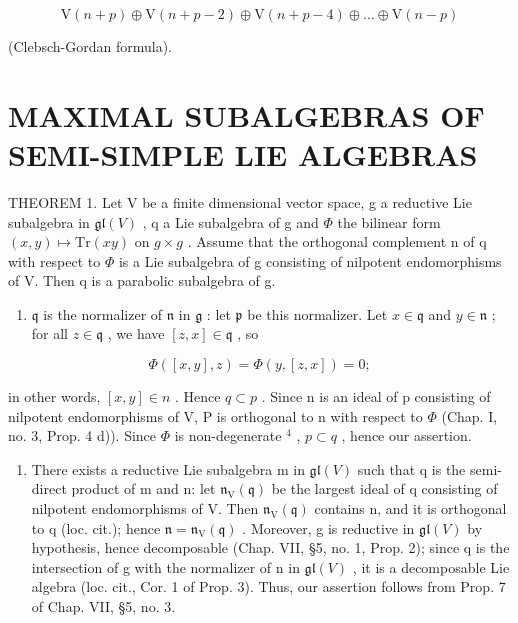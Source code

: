 \[
\mathrm{V} (n + p) \oplus \mathrm{V} (n + p - 2) \oplus \mathrm{V} (n + p - 4) \oplus \dots \oplus \mathrm{V} (n - p)
\]

(Clebsch-Gordan formula).

\section{MAXIMAL SUBALGEBRAS OF SEMI-SIMPLE LIE ALGEBRAS}

THEOREM 1. Let V be a finite dimensional vector space, g a reductive Lie subalgebra in \(\mathfrak{gl}(V)\) , q a Lie subalgebra of g and \(\Phi\) the bilinear form \((x,y)\mapsto\mathrm{Tr}(xy)\) on \(g\times g\) . Assume that the orthogonal complement n of q with respect to \(\Phi\) is a Lie subalgebra of g consisting of nilpotent endomorphisms of V. Then q is a parabolic subalgebra of g.

\begin{enumerate}
\def\labelenumi{\alph{enumi})}
\tightlist
\item
  \(\mathfrak{q}\) is the normalizer of \(\mathfrak{n}\) in \(\mathfrak{g}\) : let \(\mathfrak{p}\) be this normalizer. Let \(x \in \mathfrak{q}\) and \(y \in \mathfrak{n}\) ; for all \(z \in \mathfrak{q}\) , we have \([z, x] \in \mathfrak{q}\) , so
\end{enumerate}

\[
\Phi ([ x, y ], z) = \Phi (y, [ z, x ]) = 0;
\]

in other words, \([x,y] \in n\) . Hence \(q \subset p\) . Since n is an ideal of p consisting of nilpotent endomorphisms of V, P is orthogonal to n with respect to \(\varPhi\) (Chap. I, no. 3, Prop. 4 d)). Since \(\varPhi\) is non-degenerate \(^{4}\) , \(p \subset q\) , hence our assertion.

\begin{enumerate}
\def\labelenumi{\alph{enumi})}
\setcounter{enumi}{1}
\tightlist
\item
  There exists a reductive Lie subalgebra m in \(\mathfrak{gl}(V)\) such that q is the semi-direct product of m and n: let \(\mathfrak{n}_{\mathrm{V}}(\mathfrak{q})\) be the largest ideal of q consisting of nilpotent endomorphisms of V. Then \(\mathfrak{n}_{\mathrm{V}}(\mathfrak{q})\) contains n, and it is orthogonal to q (loc. cit.); hence \(\mathfrak{n} = \mathfrak{n}_{\mathrm{V}}(\mathfrak{q})\) . Moreover, g is reductive in \(\mathfrak{gl}(V)\) by hypothesis, hence decomposable (Chap. VII, §5, no. 1, Prop. 2); since q is the intersection of g with the normalizer of n in \(\mathfrak{gl}(V)\) , it is a decomposable Lie algebra (loc. cit., Cor. 1 of Prop. 3). Thus, our assertion follows from Prop. 7 of Chap. VII, §5, no. 3.
\end{enumerate}

